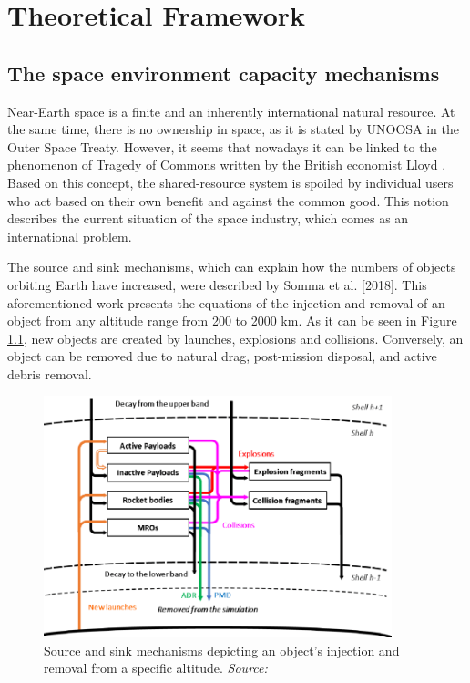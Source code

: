 \chapter{Theoretical Framework}
\label{chap:2}

\section{The space environment capacity mechanisms}
\bigskip

Near-Earth space is a finite and an inherently %
international natural resource. At the same time, there is no ownership in space, as it is stated by UNOOSA in the Outer Space Treaty. However, it seems that nowadays it can be linked to the phenomenon of Tragedy of Commons written by the British economist Lloyd \cite{Wang}. Based on this concept, the shared-resource system is spoiled by individual users who act based on their own benefit and against the common good. This notion describes the current situation of the space industry, which comes as an international problem.

\bigskip
The source and sink mechanisms, which can explain how the numbers of objects orbiting Earth have increased, were described by Somma et al. [2018]. This aforementioned work \cite{Somma 2019} presents the equations of the injection and removal of an object from any altitude range from 200 to 2000 km. As it can be seen in Figure \ref{mechanism}, new objects are created by launches, explosions and collisions. Conversely, an object can be removed due to natural drag, post-mission disposal, and active debris removal.

\begin{figure}
\centering
\includegraphics[width=0.9\textwidth]{Images/mechanism.png}\caption{Source and sink mechanisms depicting an object's injection and removal from a specific altitude. \textit{Source: \cite{Somma 2019}}}
\label{mechanism} 
\end{figure}

